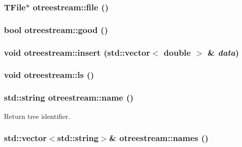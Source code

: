 \hypertarget{classotreestream_a24}{
\subsubsection[file]{\setlength{\rightskip}{0pt plus 5cm}TFile$\ast$ otreestream::file ()}}
\label{classotreestream_a24}


\hypertarget{classotreestream_a3}{
\subsubsection[good]{\setlength{\rightskip}{0pt plus 5cm}bool otreestream::good ()}}
\label{classotreestream_a3}


\hypertarget{classotreestream_a14}{
\subsubsection[insert]{\setlength{\rightskip}{0pt plus 5cm}void otreestream::insert (std::vector$<$ double $>$ \& {\em data})}}
\label{classotreestream_a14}


\hypertarget{classotreestream_a23}{
\subsubsection[ls]{\setlength{\rightskip}{0pt plus 5cm}void otreestream::ls ()}}
\label{classotreestream_a23}


\hypertarget{classotreestream_a19}{
\subsubsection[name]{\setlength{\rightskip}{0pt plus 5cm}std::string otreestream::name ()}}
\label{classotreestream_a19}


Return tree identifier. 

\hypertarget{classotreestream_a21}{
\subsubsection[names]{\setlength{\rightskip}{0pt plus 5cm}std::vector$<$std::string$>$\& otreestream::names ()}}
\label{classotreestream_a21}


